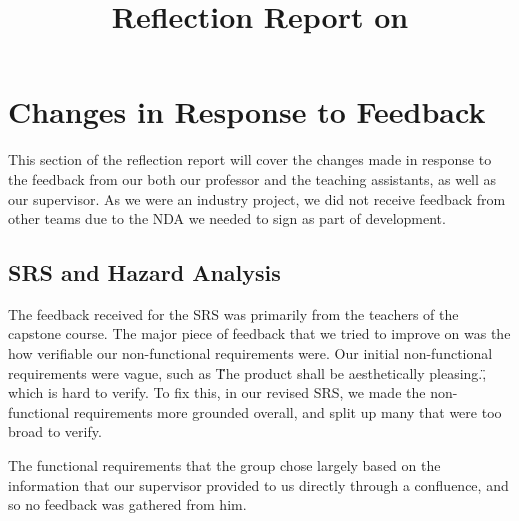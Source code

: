 \documentclass{article}
\title{Reflection Report on \progname}
\author{\authname}
\date{}
\begin{document}
\maketitle


\section{Changes in Response to Feedback}



This section of the reflection report will cover the changes made in response to the feedback from our both our professor and the teaching assistants, as well as our supervisor. As we were an industry project, we did not receive feedback from other teams due to the NDA we needed to sign as part of development.

\subsection{SRS and Hazard Analysis}

The feedback received for the SRS was primarily from the teachers of the capstone course. The major piece of feedback that we tried to improve on was the how verifiable our non-functional requirements were. Our initial non-functional requirements were vague, such as \"The product shall be aesthetically pleasing.\", which is hard to verify. To fix this, in our revised SRS, we made the non-functional requirements more grounded overall, and split up many that were too broad to verify.

The functional requirements that the group chose largely based on the information that our supervisor provided to us directly through a confluence, and so no feedback was gathered from him.
\end{document}
